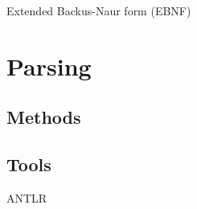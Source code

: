 \documentclass{beamer}
\begin{document}
\begin{frame}{Extended Backus-Naur form (EBNF)}
\end{frame}

\section{Parsing}

\subsection{Methods}

\subsection{Tools}

\begin{frame}{ANTLR}
\end{frame}

\end{document}
